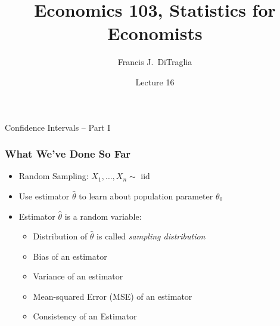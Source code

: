\documentclass[handout]{beamer}
\title[Econ 103]{Economics 103, Statistics for Economists}
\author[F. DiTraglia]{Francis J.\ DiTraglia}
\institute{University of Pennsylvania}
\date{Lecture 16}
\begin{document}
 





\begin{frame}[plain]
	\titlepage 
	

\end{frame} 




\begin{frame}

\centering \Huge Confidence Intervals -- Part I

\end{frame}

\begin{frame}
\frametitle{What We've Done So Far}

\begin{itemize}
\item Random Sampling: $X_1, \hdots, X_n \sim \mbox{ iid}$ 
\item Use estimator $\widehat{\theta}$ to learn about population parameter $\theta_0$ 
\item Estimator $\widehat{\theta}$ is a random variable: 
	\begin{itemize}
		\item Distribution of $\widehat{\theta}$ is called \emph{sampling distribution}
		\item Bias of an estimator 
		\item Variance of an estimator 
		\item Mean-squared Error (MSE) of an estimator 
		\item Consistency of an Estimator
	\end{itemize}
\end{itemize}


\end{frame}
\end{document}
